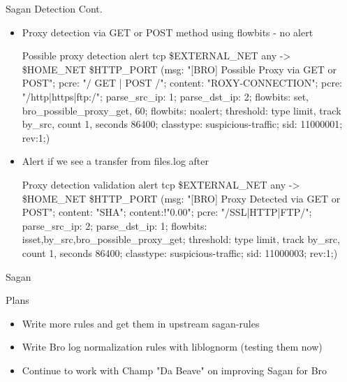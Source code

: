\documentclass[xcolor=svgnames,handout]{beamer}
\begin{document}
\begin{frame}{Sagan Detection Cont.}
  \begin{itemize}
   \item Proxy detection via GET or POST method using flowbits - no alert
    \begin{exampleblock}{Possible proxy detection}
      \alert{alert tcp \$EXTERNAL\_NET any -> \$HOME\_NET \$HTTP\_PORT (msg: "[BRO] Possible
        Proxy via GET or POST"; pcre: "/ GET | POST /"; content: "ROXY-CONNECTION";
        pcre: "/http|https|ftp:\/\//"; parse\_src\_ip: 1; parse\_dst\_ip: 2;
        flowbits: set, bro\_possible\_proxy\_get, 60; flowbits: noalert;
        threshold: type limit, track by\_src, count 1, seconds 86400;
        classtype: suspicious-traffic; sid: 11000001; rev:1;)}
    \end{exampleblock}
   \item Alert if we see a transfer from files.log after
    \begin{exampleblock}{Proxy detection validation}
      \alert{alert tcp \$EXTERNAL\_NET any -> \$HOME\_NET \$HTTP\_PORT (msg: "[BRO] Proxy
        Detected via GET or POST"; content: "SHA"; content:!"0.00"; pcre: "/SSL|HTTP|FTP/";
        parse\_src\_ip: 2; parse\_dst\_ip: 1; flowbits:
        isset,by\_src,bro\_possible\_proxy\_get; threshold: type limit, track by\_src, count 1, seconds 86400;
        classtype: suspicious-traffic; sid: 11000003; rev:1;)}
    \end{exampleblock}
  \end{itemize}
\end{frame}

\begin{frame}{Sagan}
  \begin{block}{Plans}
    \begin{itemize}
      \item Write more rules and get them in upstream sagan-rules
      \item Write Bro log normalization rules with liblognorm (testing them now)
      \item Continue to work with Champ "Da Beave" on improving Sagan for Bro
    \end{itemize}
  \end{block}
\end{frame}
\end{document}
